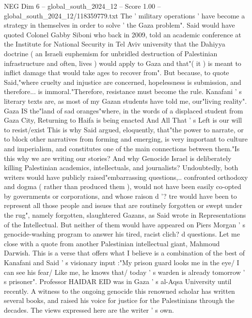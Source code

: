 \begin{textsample}{NEG Dim 6 – global\_south\_2024\_12 – Score 1.00 – global\_south\_2024\_12/118359779.txt}
The ' military operations ' have become a strategy in themselves in order to solve ' the Gaza problem".
Said would have quoted Colonel Gabby Siboni who back in 2009, told an academic conference at the Institute for National Security in Tel Aviv university that the Dahiyya doctrine ( an Israeli euphemism for unbridled destruction of Palestinian infrastructure and often, lives ) would apply to Gaza and that"( it ) is meant to inflict damage that would take ages to recover from".
But because, to quote Said,"where cruelty and injustice are concerned, hopelessness is submission, and therefore... is immoral."Therefore, resistance must become the rule.
Kanafani ' s literary texts are, as most of my Gazan students have told me, our"living reality".
Gaza IS the"land of sad oranges"where, in the words of a displaced student from Gaza City, Returning to Haifa is being enacted And All That ' s Left is our will to resist/exist This is why Said argued, eloquently, that"the power to narrate, or to block other narratives from forming and emerging, is very important to culture and imperialism, and constitutes one of the main connections between them."Is this why we are writing our stories?
And why Genocide Israel is deliberately killing Palestinian academics, intellectuals, and journalists?
Undoubtedly, both writers would have publicly raised"embarrassing questions,.. confronted orthodoxy and dogma ( rather than produced them ), would not have been easily co-opted by governments or corporations, and whose raison d '? tre would have been to represent all those people and issues that are routinely forgotten or swept under the rug", namely forgotten, slaughtered Gazans, as Said wrote in Representations of the Intellectual.
But neither of them would have appeared on Piers Morgan ' s genocide-washing program to answer his tired, racist clich? d questions.
Let me close with a quote from another Palestinian intellectual giant, Mahmoud Darwish.
This is a verse that offers what I believe is a combination of the best of Kanafani and Said ' s visionary input :"My prison guard looks me in the eye/ I can see his fear/ Like me, he knows that/ today ' s warden is already tomorrow ' s prisoner".
Professor HAIDAR EID was in Gaza ' s al-Aqsa University until recently.
A witness to the ongoing genocide this renowned scholar has written several books, and raised his voice for justice for the Palestinians through the decades.
The views expressed here are the writer ' s own.

\end{textsample}
